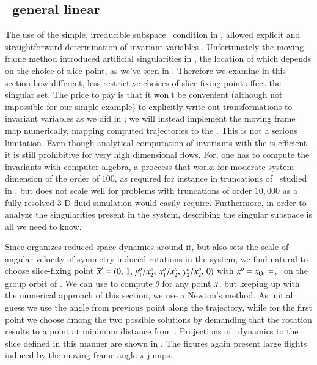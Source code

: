 
\subsection{\label{s:mfReqb}\CLe\  general linear \slice}

The use of the simple, irreducible subspace \slice\ condition in ,  
 allowed explicit and straightforward determination of invariant 
variables . Unfortunately the moving frame method introduced artificial 
singularities in \reducedsp, the location of which depends on the choice of slice point,
as we've seen in .
Therefore we examine in this section how different, less restrictive choices of slice fixing 
point affect the singular set. The price to pay is that it won't be convenient (although not
impossible for our simple example) to explicitly write out transformations 
to invariant variables as we did in ; 
we will instead implement the moving frame map numerically,
mapping computed trajectories to the \slice.
This is not a serious limitation. Even though analytical computation 
of invariants with the {\mframes} is efficient, it is still
prohibitive for very high dimensional flows. For, one has
to compute the invariants with computer algebra, a proccess
that works for moderate system dimension of the order of $100$,
as required for instance in truncations of \KSe\ studied in ,
but does not scale well for problems with truncations of order $10,000$ as
a fully resolved $3$-D fluid simulation would easily require.
Furthermore, in order to analyze the singularities present in the system, 
describing the singular subspace is all we need to know. 

Since  organizes reduced space dynamics around it, but also sets the
scale of angular velocity of symmetry induced rotations in the system, we
find natural to choose slice-fixing point ${\overline{x}'}=(0,\,1,\,y_1^{o}/x_2^{o},\,x_1^{o}/x_2^{o},\,y_2^{o}/x_2^{o},\,0)$ 
with $x^{o}= x_{\mathrm{Q}_{1}}=$, \ie\ on the group orbit of \reqv.
We can use  to compute $\theta$ for any point $x$, but keeping up
with the numerical approach of this section, we use a Newton's method. As initial
guess we use the angle from previous point along the trajectory, while for the 
first point we choose among the two possible solutions by demanding that the rotation
results to a point at minimum distance from \slicep.
Projections of \cLe\ dynamics to the slice defined in this manner are
shown in . The figures again present large flights induced
by the moving frame angle $\pi$-jumps.

